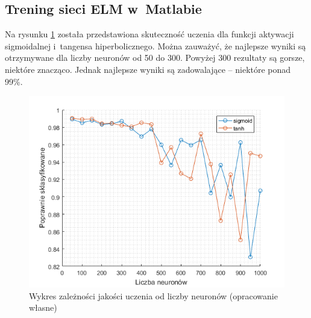 \documentclass[pl]{minipw} %
\begin{document}
\subsection{Trening sieci ELM w~Matlabie}
Na rysunku \ref{dota_liczba_neuronow} została przedstawiona skuteczność uczenia dla funkcji aktywacji sigmoidalnej i~tangensa hiperbolicznego.
Można zauważyć, że najlepsze wyniki są otrzymywane dla liczby neuronów od 50 do 300.
Powyżej 300 rezultaty są gorsze, niektóre znacząco.
Jednak najlepsze wyniki są zadowalające -- niektóre ponad 99\%.
\begin{figure}[H]
\centering
\includegraphics[width=\textwidth]{dota_liczba_neuronow.png}
\caption[Wykres zależności jakości uczenia od liczby neuronów]{Wykres zależności jakości uczenia od liczby neuronów (opracowanie własne)}
\label{dota_liczba_neuronow}
\end{figure}
\end{document}
